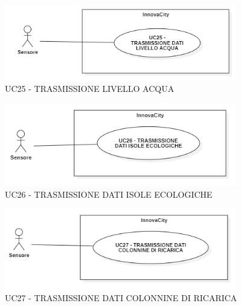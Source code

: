 
\begin{figure}[H]
    \centering
    \includegraphics[width=0.9\textwidth]{../Images/uc25.PNG}
    \caption{UC25 - TRASMISSIONE LIVELLO ACQUA }
\end{figure}



\begin{figure}[H]
    \centering
    \includegraphics[width=0.9\textwidth]{../Images/uc26.PNG}
    \caption{UC26 - TRASMISSIONE DATI ISOLE ECOLOGICHE }
\end{figure}



\begin{figure}[H]
    \centering
    \includegraphics[width=0.9\textwidth]{../Images/uc27.PNG}
    \caption{UC27 - TRASMISSIONE DATI COLONNINE DI RICARICA }
\end{figure}


